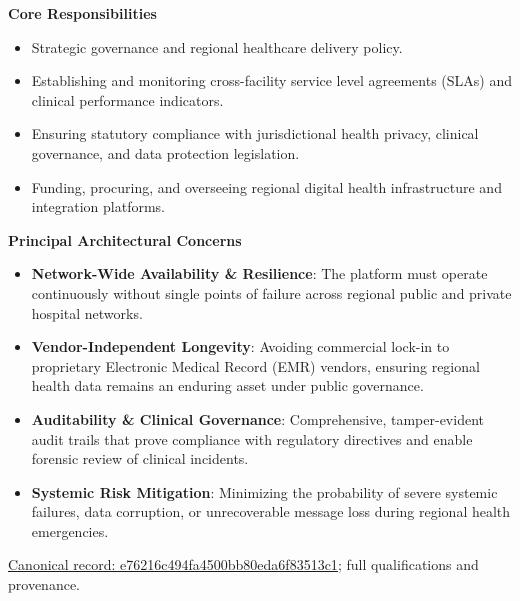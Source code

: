 \par\medskip\textbf{Core Responsibilities}\par


\begin{itemize}


\item Strategic governance and regional healthcare delivery policy.

\item Establishing and monitoring cross-facility service level agreements (SLAs) and clinical performance indicators.

\item Ensuring statutory compliance with jurisdictional health privacy, clinical governance, and data protection legislation.

\item Funding, procuring, and overseeing regional digital health infrastructure and integration platforms.

\end{itemize}


\par\medskip\textbf{Principal Architectural Concerns}\par


\begin{itemize}


\item \textbf{Network-Wide Availability \& Resilience}: The platform must operate continuously without single points of failure across regional public and private hospital networks.

\item \textbf{Vendor-Independent Longevity}: Avoiding commercial lock-in to proprietary Electronic Medical Record (EMR) vendors, ensuring regional health data remains an enduring asset under public governance.

\item \textbf{Auditability \& Clinical Governance}: Comprehensive, tamper-evident audit trails that prove compliance with regulatory directives and enable forensic review of clinical incidents.

\item \textbf{Systemic Risk Mitigation}: Minimizing the probability of severe systemic failures, data corruption, or unrecoverable message loss during regional health emergencies.

\end{itemize}

{\footnotesize \href{../../../../continuum/motivation/stakeholder/e76216c494fa4500bb80eda6f83513c1.md}{Canonical record: e76216c494fa4500bb80eda6f83513c1}; full qualifications and provenance.}\par
